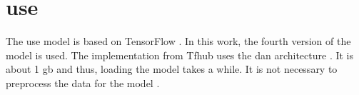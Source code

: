 \section{\ac{use}}\label{sec:impl-use}

The \ac{use} model is based on TensorFlow \cite{HfsentTrans2019}.
In this work, the fourth version of the model is used.
The implementation from Tfhub uses the \ac{dan} architecture \cite{UniversalSentEnc-dev}.
It is about 1 \ac{gb} and thus, loading the model takes a while.
It is not necessary to preprocess the data for the model \cite{UniversalSentEnc-dev}.